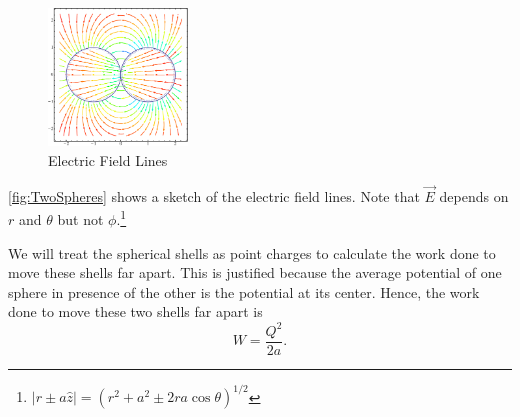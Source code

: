 \documentclass{esg8022pset}
\begin{document}
\begin{solution}
  \begin{figure}[ht]
    \centering
    \includegraphics[width=0.33\textwidth]{ps03_sol_07}
    \caption{Electric Field Lines}
    \label{fig:TwoSpheres}
  \end{figure}

  \autoref{fig:TwoSpheres} shows a sketch of the electric field lines. Note that $\vec{E}$ depends on $r$ and $\theta$ but not $\phi$.\footnote{$|r\pm a \hat z| = \left(r^2 + a^2 \pm 2 ra\cos \theta \right)^{1/2}$}

  We will treat the spherical shells as point charges to calculate the work done to move these shells far apart. This is justified because the average potential of one sphere in presence of the other is the potential at its center.  %
  Hence, the work done to move these two shells far apart is
  $$W = \frac{Q^2}{2a}.$$
\end{solution}
\end{document}
